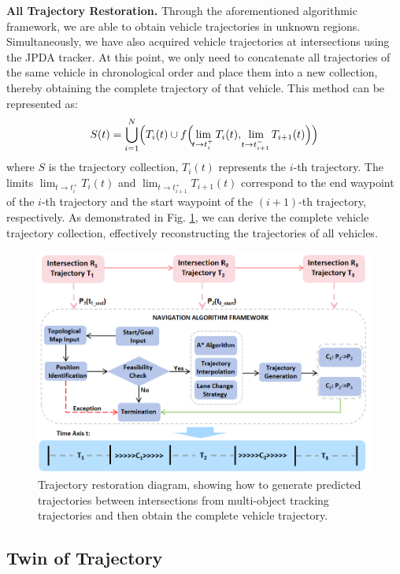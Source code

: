 \documentclass[lettersize,journal]{IEEEtran}
\begin{document}
\textbf{All Trajectory Restoration.}
Through the aforementioned algorithmic framework, we are able to obtain vehicle trajectories in unknown regions. 
Simultaneously, we have also acquired vehicle trajectories at intersections using the JPDA tracker. 
At this point, we only need to concatenate all trajectories of the same vehicle in chronological order and place them into a new collection, thereby obtaining the complete trajectory of that vehicle. 
This method can be represented as: 
\begin{align}
	S(t) = \bigcup_{i=1}^{N} \Bigl( T_i(t) \cup f\Bigl( \lim_{\!t \to t_i^+} T_i(t), \lim_{\!t \to t_{i+1}^-} T_{i+1}(t) \Bigr) \Bigr)
\end{align}
where \(S\) is the trajectory collection, \(T_i(t)\) represents the \(i\)-th trajectory. 
The limits \(\lim_{t \to t_i^+} T_i(t)\) and \(\lim_{t \to t_{i+1}^+} T_{i+1}(t)\) correspond to the end waypoint of the \(i\)-th trajectory and the start waypoint of the \((i+1)\)-th trajectory, respectively.
As demonstrated in Fig. \ref{fig:5}, we can derive the complete vehicle trajectory collection, effectively reconstructing the trajectories of all vehicles.
\begin{figure}[t]
	\centering
	\includegraphics[width=\linewidth]{picture/picture5.png} 
	\caption{Trajectory restoration diagram, showing how to generate predicted trajectories between intersections from multi-object tracking trajectories and then obtain the complete vehicle trajectory.} 
	\label{fig:5} 
\end{figure}

\subsection{Twin of Trajectory}
\end{document}
